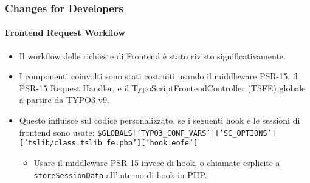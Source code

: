 
\begin{frame}[fragile]
	\frametitle{Changes for Developers}
	\framesubtitle{Frontend Request Workflow}

	\lstset{basicstyle=\smaller\ttfamily}

	\begin{itemize}
		\item Il workflow delle richieste di Frontend è stato rivisto significativamente.

		\item I componenti coinvolti sono stati costruiti usando il middleware PSR-15, il PSR-15 Request Handler,
			e il TypoScriptFrontendController (TSFE) globale a partire da TYPO3 v9.

		\item Questo influisce sul codice personalizzato, se i seguenti hook e le sessioni di frontend sono usate:\newline
			{\fontsize{7}{8}\selectfont\texttt{\$GLOBALS['TYPO3\_CONF\_VARS']['SC\_OPTIONS']['tslib/class.tslib\_fe.php']['hook\_eofe']}}

			\begin{itemize}\smaller
				\item[\ding{228}] Usare il middleware PSR-15 invece di hook, o chiamate esplicite a \texttt{storeSessionData}
				all'interno di hook in PHP.
			\end{itemize}\normalsize

	\end{itemize}

\end{frame}


